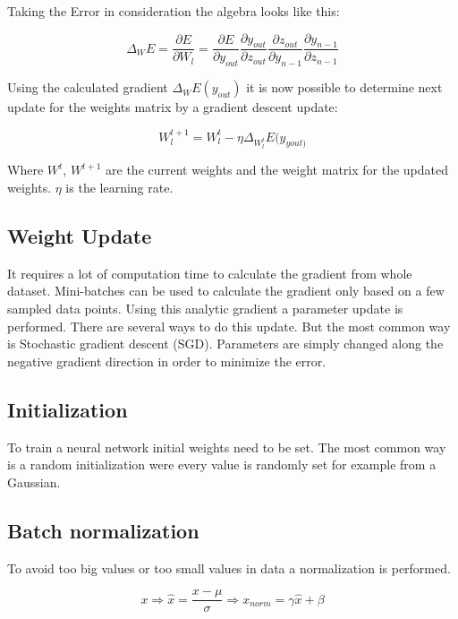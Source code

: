 Taking the Error in consideration the algebra looks like this:

\begin{equation}
\Delta_{W}E =
\frac{\partial E}{\partial W_{l}} =
\frac{\partial E}{\partial y_{out}}
\frac{\partial y_{out}}{\partial z_{out}}
\frac{\partial z_{out}}{\partial y_{n-1}}
\frac{\partial y_{n-1}}{\partial z_{n-1}}
\end{equation}

Using the calculated gradient $\Delta_{W}E(y_{out}) $ it is now possible to determine next update for the weights matrix by a gradient descent update:

\begin{equation}
W_{l}^{t+1}=
W_{l}^{t}-\eta\Delta_{W_{l}^{t}}E(y_{yout)}
\end{equation}

Where \(W^{t}\), \(W^{t+1}\) are the current weights and the weight matrix for the updated weights. \(\eta\) is the learning rate.

\subsection{Weight Update}
It requires a lot of computation time to calculate the gradient from whole dataset. Mini-batches can be used to calculate the gradient only based on a few sampled data points. Using this analytic gradient a parameter update is performed. There are several ways to do this update. But the most common way is Stochastic gradient descent (SGD). 
Parameters are simply changed along the negative gradient direction in order to minimize the error.


\subsection{Initialization}
To train a neural network initial weights need to be set. The most common way is a random initialization were every value is randomly set for example from a Gaussian.

\subsection{Batch normalization}
To avoid too big values or too small values in data a normalization is performed.

\begin{equation}
x \Rightarrow \hat{x} = \dfrac{x-\mu}{\sigma} \Rightarrow x_{norm} = \gamma \hat{x} + \beta
\end{equation}

